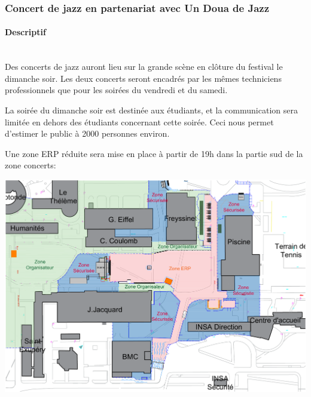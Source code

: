 \documentclass[hidelinks, paper=a4, fontsize=13pt]{report}
\begin{document}
\subsubsection{Concert de jazz en partenariat avec Un Doua de Jazz}

\paragraph{Descriptif}\mbox{}\\
Des concerts de jazz auront lieu sur la grande scène en clôture du festival le dimanche soir. Les deux concerts seront encadrés par les mêmes techniciens professionnels que pour les soirées du vendredi et du samedi. 

La soirée du dimanche soir est destinée aux étudiants, et la communication sera limitée en dehors des étudiants concernant cette soirée. Ceci nous permet d’estimer le public à 2000 personnes environ. 

Une zone ERP réduite sera mise en place à partir de 19h dans la partie sud de la zone concerts:

\begin{center}
\includegraphics[width=.8\textwidth,keepaspectratio]{Exports/Plan_24h_44eme-ERP_Dimanche}

\end{center}
\newpage
\end{document}
